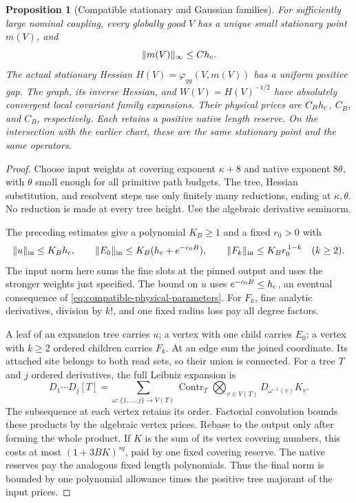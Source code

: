\documentclass[11pt,reqno]{amsart}
\numberwithin{equation}{section}
\newtheorem{proposition}[theorem]{Proposition}
\theoremstyle{definition}
\theoremstyle{remark}
\begin{document}
\begin{proposition}[Compatible stationary and Gaussian families]
\label{prop:compatible-stationary-data}
For sufficiently large nominal coupling,
every globally good \(V\) has a unique small
stationary point \(m(V)\), and
\[
                         \|m(V)\|_\infty\le Ch_{\rm c}.
\]
The actual stationary Hessian
\(H(V)=\varphi_{yy}(V,m(V))\)
has a uniform positive gap.
The graph, its inverse Hessian, and
\(W(V)=H(V)^{-1/2}\) have absolutely
convergent local covariant family expansions.
Their physical prices are \(C_Bh_{\rm c}\),
\(C_B\), and \(C_B\), respectively.
Each retains a positive native length reserve.
On the intersection with the earlier chart,
these are the same stationary point and
the same operators.
\end{proposition}
\begin{proof}
Choose input weights at covering exponent
\(\kappa+8\) and native exponent \(8\theta\),
with \(\theta\) small enough for all primitive
path budgets. The tree, Hessian substitution,
and resolvent steps use only finitely many
reductions, ending at \(\kappa,\theta\).
No reduction is made at every tree height.
Use the algebraic derivative seminorm.

The preceding estimates give a polynomial
\(K_B\ge1\) and a fixed \(r_0>0\) with
\[
 \|u\|_{\rm in}\le K_Bh_{\rm c},\qquad
 \|E_0\|_{\rm in}\le K_B(h_{\rm c}+e^{-c_0B}),\qquad
 \|F_k\|_{\rm in}\le K_Br_0^{\,1-k}\quad(k\ge2).
\]
The input norm here sums the fine slots at
the pinned output and uses the stronger
weights just specified.
The bound on \(u\) uses
\(e^{-c_0B}\le h_{\rm c}\), an eventual
consequence of
\eqref{eq:compatible-physical-parameters}.
For \(F_k\), fine analytic derivatives,
division by \(k!\), and one fixed radius
loss pay all degree factors.

A leaf of an expansion tree carries \(u\);
a vertex with one child carries \(E_0\);
a vertex with \(k\ge2\) ordered children
carries \(F_k\).
At an edge sum the joined coordinate.
Its attached site belongs to both read
sets, so their union is connected.
For a tree \(T\) and \(j\) ordered derivatives,
the full Leibniz expansion is
\[
 D_1\cdots D_j[T]
  =\sum_{\omega:\{1,\ldots,j\}\to V(T)}
       \operatorname{Contr}_T
            \bigotimes_{v\in V(T)}
                          D_{\omega^{-1}(v)}K_v .
\]
The subsequence at each vertex retains
its order. Factorial convolution bounds
these products by the algebraic vertex
prices. Rebase to the output only after
forming the whole product.
If \(K\) is the sum of its vertex covering
numbers, this costs at most
\((1+3BK)^{sq}\), paid by one fixed covering
reserve. The native reserves pay the
analogous fixed length polynomials.
Thus the final norm is bounded by one
polynomial allowance times the positive
tree majorant of the input prices.


\end{proof}
\end{document}
